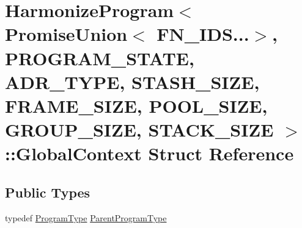 \hypertarget{structHarmonizeProgram_3_01PromiseUnion_3_01FN__IDS_8_8_8_4_00	PROGRAM__STATE_00	ADR__TYPE_00	ST95fb55d31288aa76301ce5d39247c065}{\section{Harmonize\-Program$<$ Promise\-Union$<$ F\-N\-\_\-\-I\-D\-S...$>$, P\-R\-O\-G\-R\-A\-M\-\_\-\-S\-T\-A\-T\-E, A\-D\-R\-\_\-\-T\-Y\-P\-E, S\-T\-A\-S\-H\-\_\-\-S\-I\-Z\-E, F\-R\-A\-M\-E\-\_\-\-S\-I\-Z\-E, P\-O\-O\-L\-\_\-\-S\-I\-Z\-E, G\-R\-O\-U\-P\-\_\-\-S\-I\-Z\-E, S\-T\-A\-C\-K\-\_\-\-S\-I\-Z\-E $>$\-:\-:Global\-Context Struct Reference}
\label{structHarmonizeProgram_3_01PromiseUnion_3_01FN__IDS_8_8_8_4_00	PROGRAM__STATE_00	ADR__TYPE_00	ST95fb55d31288aa76301ce5d39247c065}
}
\subsection*{Public Types}
\begin{DoxyCompactItemize}
\item 
typedef \hyperlink{structHarmonizeProgram_3_01PromiseUnion_3_01FN__IDS_8_8_8_4_00	PROGRAM__STATE_00	ADR__TYPE_00	ST96305cc1a177b714bc64a5044f46c97c_a221a90c8933fd67a1e48604b89e2f6fe}{Program\-Type} \hyperlink{structHarmonizeProgram_3_01PromiseUnion_3_01FN__IDS_8_8_8_4_00	PROGRAM__STATE_00	ADR__TYPE_00	ST95fb55d31288aa76301ce5d39247c065_a08e2492830a43bd5d2585201ac6f2279}{Parent\-Program\-Type}
\end{DoxyCompactItemize}
